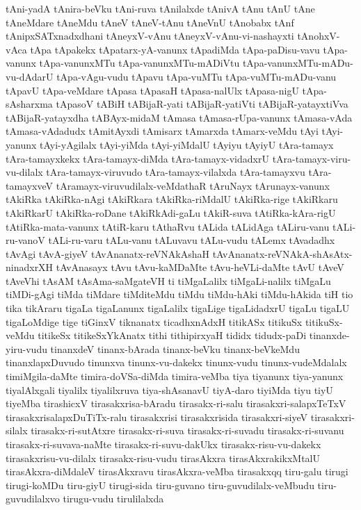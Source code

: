 {tAni-yadA
tAnira-beVku
tAni-ruva
tAnilalxde
tAnivA
tAnu
tAnU
tAne
tAneMdare
tAneMdu
tAneV
tAneV-tAnu
tAneVnU
tAnobabx
tAnf
tAnipxSATxnadxdhani
tAneyxV-vAnu
tAneyxV-vAnu-vi-nashayxti
tAnohxV-vAca
tApa
tApakekx
tApatarx-yA-vanunx
tApadiMda
tApa-paDisu-vavu
tApa-vanunx
tApa-vanunxMTu
tApa-vanunxMTu-mADiVtu
tApa-vanunxMTu-mADu-vu-dAdarU
tApa-vAgu-vudu
tApavu
tApa-vuMTu
tApa-vuMTu-mADu-vanu
tApavU
tApa-veMdare
tApasa
tApasaH
tApasa-nalUlx
tApasa-nigU
tApa-sAsharxma
tApasoV
tABiH
tABijaR-yati
tABijaR-yatiVti
tABijaR-yatayxtiVva
tABijaR-yatayxdha
tABAyx-midaM
tAmasa
tAmasa-rUpa-vanunx
tAmasa-vAda
tAmasa-vAdadudx
tAmitAyxdi
tAmisarx
tAmarxda
tAmarx-veMdu
tAyi
tAyi-yanunx
tAyi-yAgilalx
tAyi-yiMda
tAyi-yiMdalU
tAyiyu
tAyiyU
tAra-tamayx
tAra-tamayxkekx
tAra-tamayx-diMda
tAra-tamayx-vidadxrU
tAra-tamayx-viru-vu-dilalx
tAra-tamayx-viruvudo
tAra-tamayx-vilalxda
tAra-tamayxvu
tAra-tamayxveV
tAramayx-viruvudilalx-veMdathaR
tAruNayx
tArunayx-vanunx
tAkiRka
tAkiRka-nAgi
tAkiRkara
tAkiRka-riMdalU
tAkiRka-rige
tAkiRkaru
tAkiRkarU
tAkiRka-roDane
tAkiRkAdi-gaLu
tAkiR-suva
tAtiRka-kAra-rigU
tAtiRka-mata-vanunx
tAtiR-karu
tAthaRvu
tALida
tALidAga
tALiru-vanu
tALi-ru-vanoV
tALi-ru-varu
tALu-vanu
tALuvavu
tALu-vudu
tALemx
tAvadadhx
tAvAgi
tAvA-giyeV
tAvAnanatx-reVNAkAshaH
tAvAnanatx-reVNAkA-shAsAtx-ninadxrXH
tAvAnasayx
tAvu
tAvu-kaMDaMte
tAvu-heVLi-daMte
tAvU
tAveV
tAveVhi
tAsAM
tAsAma-saMgateVH
ti
tiMgaLalilx
tiMgaLi-nalilx
tiMgaLu
tiMDi-gAgi
tiMda
tiMdare
tiMditeMdu
tiMdu
tiMdu-hAki
tiMdu-hAkida
tiH
tio
tika
tikAraru
tigaLa
tigaLanunx
tigaLalilx
tigaLige
tigaLidadxrU
tigaLu
tigaLU
tigaLoMdige
tige
tiGinxV
tiknanatx
ticadhxnAdxH
titikASx
titikuSx
titikuSx-veMdu
titikeSx
titikeSxYkAnatx
tithi
tithipirxyaH
tididx
tidudx-paDi
tinanxde-yiru-vudu
tinanxdeV
tinanx-bArada
tinanx-beVku
tinanx-beVkeMdu
tinanxlapxDuvudo
tinunxva
tinunx-vu-dakekx
tinunx-vudu
tinunx-vudeMdalalx
timiMgila-daMte
timira-doVSa-diMda
timira-veMba
tiya
tiyanunx
tiya-yanunx
tiyalAlxgali
tiyalilx
tiyalilxruva
tiya-shAsanavU
tiyA-daro
tiyiMda
tiyu
tiyU
tiyeMba
tirashicxV
tirasakxrisa-bAradu
tirasakx-ri-salu
tirasakxri-salapxTeTxV
tirasakxrisalapxDuTiTx-ralu
tirasakxrisi
tirasakxrisida
tirasakxri-siyeV
tirasakxri-silalx
tirasakx-ri-sutAtxre
tirasakx-ri-suva
tirasakx-ri-suvadu
tirasakx-ri-suvanu
tirasakx-ri-suvava-naMte
tirasakx-ri-suvu-dakUkx
tirasakx-risu-vu-dakekx
tirasakxrisu-vu-dilalx
tirasakx-risu-vudu
tirasAkxra
tirasAkxrakikxMtalU
tirasAkxra-diMdaleV
tirasAkxravu
tirasAkxra-veMba
tirasakxqq
tiru-galu
tirugi
tirugi-koMDu
tiru-giyU
tirugi-sida
tiru-guvano
tiru-guvudilalx-veMbudu
tiru-guvudilalxvo
tirugu-vudu
tirulilalxda
}
